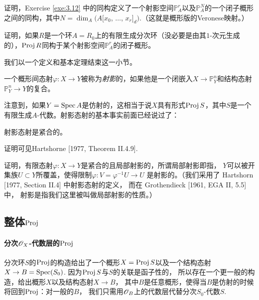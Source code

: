 \begin{exe}\label{exe:3.17}
证明，Exercise \ref{exe:3.12} 中的同构定义了一个射影空间$\mathbb P_A^r$以及$\mathbb P_A^N$的一个闭子概形之间的同构，其中$N=\dim_A(A[x_0$, $\dots$, $x_r]_d)$.（这就是概形版的Veronese映射。）
\end{exe}

\begin{exe}\label{exe:3.18}
证明，如果$R$是一个环$A=R_0$上的有限生成分次环（没必要是由其$1$-次元生成的），$\operatorname{Proj} R$同构于某个射影空间$\mathbb P_A^r$的闭子概形。
\end{exe}

我们以一个定义和基本定理结束这一小节。

\begin{defi}
一个概形间态射$\varphi:X\to Y$被称为\textit{射影}的，如果他是一个闭嵌入$X\to \mathbb P_Y^n$和结构态射$\mathbb P_Y^n\to Y$的复合。
\end{defi}

注意到，如果$Y=\operatorname{Spec} A$是仿射的，这相当于说$X$具有形式$\operatorname{Proj} S$，其中$S$是一个有限生成$A$-代数。射影态射的基本事实前面已经说过了：

\begin{thm}\label{thm:3.20}
射影态射是紧合的。
\end{thm}

证明可见Hartshorne [1977, Theorem II.4.9].

\begin{exe}\label{exe:3.21}
证明，有限态射$\varphi:X\to Y$是紧合的且局部射影的，所谓局部射影即指，
$Y$可以被开集族$U\subset Y$所覆盖，使得限制$\varphi:V=\varphi^{-1}U\to U$
是射影的。（我们采用了 Hartshorn [1977, Section II.4] 中射影态射的定义，
而在 Grothendieck [1961, EGA II, 5.5] 中，
射影是指我们这里被叫做局部射影的性质。）
\end{exe}

\subsection{整体\texorpdfstring{$\operatorname{Proj}$}{Proj}} \label{s:3.2.3}

\paragraph*{分次\texorpdfstring{$\mathscr{O}_X$}{OX}-代数层的\texorpdfstring{$\operatorname{Proj}$}{Proj}}
分次环$S$的$\operatorname{Proj}$的构造给出了一个概形$X=\operatorname{Proj} S$以及一个结构态射
$X\to B=\operatorname{Spec}(S_0)$. 因为$\operatorname{Proj} S$与$S$的关联是函子性的，
所以存在一个更一般的构造，给出概形$X$以及结构态射$X\to B$，
其中$B$是任意概形，使得当$B$是仿射的时候将回到$\operatorname{Proj}$：对一般的$B$，
我们只需用$\mathscr{O}_B$上的代数层代替分次$S_0$-代数$S$.

